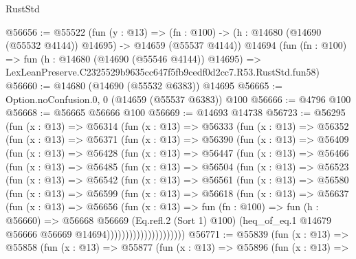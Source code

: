 \begin{lexlean}{RustStd}
\begin{coremodule}
@56656 := @55522
    (fun (y : @13) =>
    (fn : @100) -> (h : @14680 (@14690 (@55532 @4144)) @14695) -> @14659 (@55537 @4144))
    @14694
    (fun (fn : @100) =>
    fun (h : @14680 (@14690 (@55546 @4144)) @14695) =>
    LexLeanPreserve.C2325529b9635cc647f5fb9cedf0d2cc7.R53.RustStd.fun58)
@56660 := @14680 (@14690 (@55532 @6383)) @14695
@56665 := Option.noConfusion.{0, 0} (@14659 (@55537 @6383)) @100
@56666 := @4796 @100
@56668 := @56665 @56666 @100
@56669 := @14693 @14738
@56723 := @56295
    (fun (x : @13) =>
    @56314
      (fun (x : @13) =>
      @56333
        (fun (x : @13) =>
        @56352
          (fun (x : @13) =>
          @56371
            (fun (x : @13) =>
            @56390
              (fun (x : @13) =>
              @56409
                (fun (x : @13) =>
                @56428
                  (fun (x : @13) =>
                  @56447
                    (fun (x : @13) =>
                    @56466
                      (fun (x : @13) =>
                      @56485
                        (fun (x : @13) =>
                        @56504
                          (fun (x : @13) =>
                          @56523
                            (fun (x : @13) =>
                            @56542
                              (fun (x : @13) =>
                              @56561
                                (fun (x : @13) =>
                                @56580
                                  (fun (x : @13) =>
                                  @56599
                                    (fun (x : @13) =>
                                    @56618
                                      (fun (x : @13) =>
                                      @56637
                                        (fun (x : @13) =>
                                        @56656
                                          (fun (x : @13) =>
                                          fun (fn : @100) =>
                                          fun (h : @56660) =>
                                          @56668
                                            @56669
                                            (Eq.refl.{2} (Sort 1) @100)
                                            (heq_of_eq.{1}
                                              @14679
                                              @56666
                                              @56669
                                              @14694)))))))))))))))))))))
@56771 := @55839
    (fun (x : @13) =>
    @55858
      (fun (x : @13) =>
      @55877
        (fun (x : @13) =>
        @55896
          (fun (x : @13) =>

\end{coremodule}
\end{lexlean}

